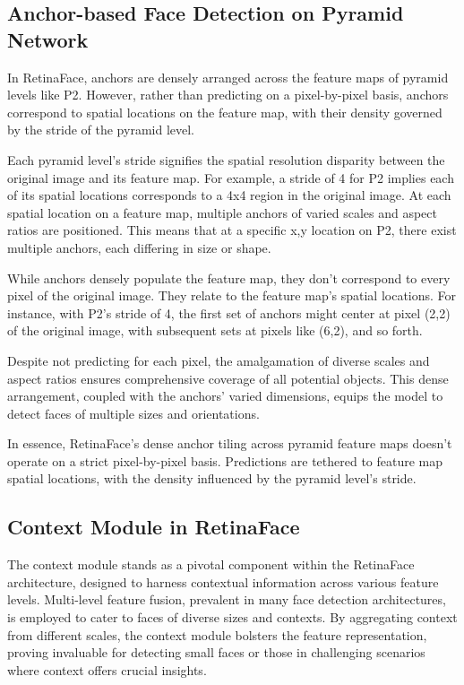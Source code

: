 \documentclass{article}
\begin{document}
\subsection{Anchor-based Face Detection on Pyramid Network}

In RetinaFace, anchors are densely arranged across the feature maps of pyramid levels like P2. However, rather than predicting on a pixel-by-pixel basis, anchors correspond to spatial locations on the feature map, with their density governed by the stride of the pyramid level.

Each pyramid level's stride signifies the spatial resolution disparity between the original image and its feature map. For example, a stride of 4 for P2 implies each of its spatial locations corresponds to a 4x4 region in the original image. At each spatial location on a feature map, multiple anchors of varied scales and aspect ratios are positioned. This means that at a specific x,y location on P2, there exist multiple anchors, each differing in size or shape.

While anchors densely populate the feature map, they don't correspond to every pixel of the original image. They relate to the feature map's spatial locations. For instance, with P2's stride of 4, the first set of anchors might center at pixel (2,2) of the original image, with subsequent sets at pixels like (6,2), and so forth.

Despite not predicting for each pixel, the amalgamation of diverse scales and aspect ratios ensures comprehensive coverage of all potential objects. This dense arrangement, coupled with the anchors' varied dimensions, equips the model to detect faces of multiple sizes and orientations.

In essence, RetinaFace's dense anchor tiling across pyramid feature maps doesn't operate on a strict pixel-by-pixel basis. Predictions are tethered to feature map spatial locations, with the density influenced by the pyramid level's stride.

\subsection{Context Module in RetinaFace}

The context module stands as a pivotal component within the RetinaFace architecture, designed to harness contextual information across various feature levels. Multi-level feature fusion, prevalent in many face detection architectures, is employed to cater to faces of diverse sizes and contexts. By aggregating context from different scales, the context module bolsters the feature representation, proving invaluable for detecting small faces or those in challenging scenarios where context offers crucial insights.
\end{document}
